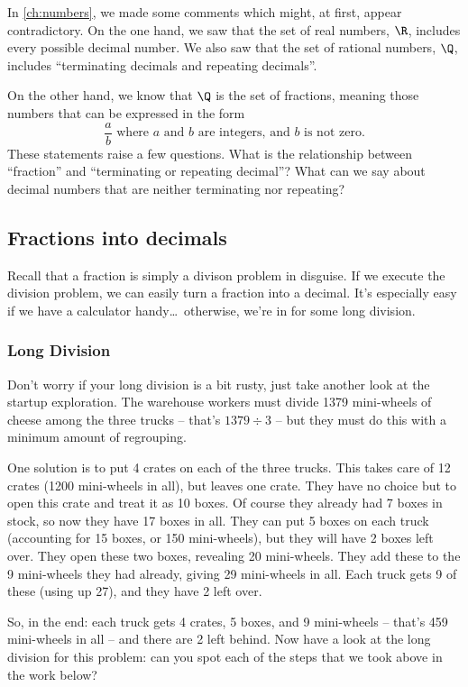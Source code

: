 In \cref{ch:numbers}, we made some comments which might, at first, appear contradictory. On the one hand, we saw that the set of real numbers, $\R$, includes every possible decimal number. We also saw that the set of rational numbers, $\Q$, includes ``terminating decimals and repeating decimals''. 

On the other hand, we know that $\Q$ is the set of fractions, meaning those numbers that can be expressed in the form \[\frac{a}{b} \text{ where $a$ and $b$ are integers, and $b$ is not zero.}\]
These statements raise a few questions. What is the relationship between ``fraction'' and ``terminating or repeating decimal''? What can we say about decimal numbers that are neither terminating nor repeating?

\subsection{Fractions into decimals}

Recall that a fraction is simply a divison problem in disguise. If we execute the division problem, we can easily turn a fraction into a decimal. It's especially easy if we have a calculator handy\ldots\ otherwise, we're in for some long division.

\subsubsection{Long Division}

Don't worry if your long division is a bit rusty, just take another look at the startup exploration. The warehouse workers must divide 1379 mini-wheels of cheese among the three trucks -- that's $1379 \div 3$ -- but they must do this with a minimum amount of regrouping.

One solution is to put 4 crates on each of the three trucks. This takes care of 12 crates (1200 mini-wheels in all), but leaves one crate. They have no choice but to open this crate and treat it as 10 boxes. Of course they already had 7 boxes in stock, so now they have 17 boxes in all. They can put 5 boxes on each truck (accounting for 15 boxes, or 150 mini-wheels), but they will have 2 boxes left over. They open these two boxes, revealing 20 mini-wheels. They add these to the 9 mini-wheels they had already, giving 29 mini-wheels in all. Each truck gets 9 of these (using up 27), and they have 2 left over.

So, in the end: each truck gets 4 crates, 5 boxes, and 9 mini-wheels -- that's 459 mini-wheels in all -- and there are 2 left behind. Now have a look at the long division for this problem: can you spot each of the steps that we took above in the work below?

